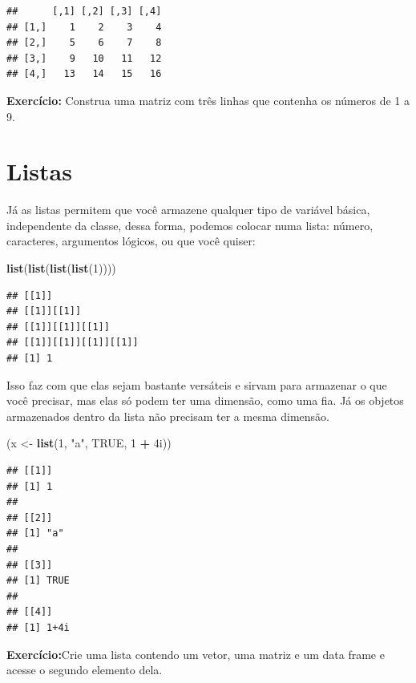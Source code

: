 \documentclass[]{book}
\newenvironment{Shaded}{\begin{snugshade}}{\end{snugshade}}
\newcommand{\KeywordTok}[1]{\textcolor[rgb]{0.13,0.29,0.53}{\textbf{#1}}}
\newcommand{\DecValTok}[1]{\textcolor[rgb]{0.00,0.00,0.81}{#1}}
\newcommand{\StringTok}[1]{\textcolor[rgb]{0.31,0.60,0.02}{#1}}
\newcommand{\OtherTok}[1]{\textcolor[rgb]{0.56,0.35,0.01}{#1}}
\newcommand{\OperatorTok}[1]{\textcolor[rgb]{0.81,0.36,0.00}{\textbf{#1}}}
\newcommand{\NormalTok}[1]{#1}
\theoremstyle{definition}
\theoremstyle{definition}
\theoremstyle{definition}
\theoremstyle{remark}
\begin{document}
\begin{verbatim}
##      [,1] [,2] [,3] [,4]
## [1,]    1    2    3    4
## [2,]    5    6    7    8
## [3,]    9   10   11   12
## [4,]   13   14   15   16
\end{verbatim}

\textbf{Exercício:} Construa uma matriz com três linhas que contenha os
números de 1 a 9.

\section{Listas}\label{listas}

Já as listas permitem que você armazene qualquer tipo de variável
básica, independente da classe, dessa forma, podemos colocar numa lista:
número, caracteres, argumentos lógicos, ou que você quiser:

\begin{Shaded}
\begin{Highlighting}[]
\KeywordTok{list}\NormalTok{(}\KeywordTok{list}\NormalTok{(}\KeywordTok{list}\NormalTok{(}\KeywordTok{list}\NormalTok{(}\DecValTok{1}\NormalTok{))))}
\end{Highlighting}
\end{Shaded}

\begin{verbatim}
## [[1]]
## [[1]][[1]]
## [[1]][[1]][[1]]
## [[1]][[1]][[1]][[1]]
## [1] 1
\end{verbatim}

Isso faz com que elas sejam bastante versáteis e sirvam para armazenar o
que você precisar, mas elas só podem ter uma dimensão, como uma fia. Já
os objetos armazenados dentro da lista não precisam ter a mesma
dimensão.

\begin{Shaded}
\begin{Highlighting}[]
\NormalTok{(x <-}\StringTok{ }\KeywordTok{list}\NormalTok{(}\DecValTok{1}\NormalTok{, }\StringTok{"a"}\NormalTok{, }\OtherTok{TRUE}\NormalTok{, }\DecValTok{1} \OperatorTok{+}\StringTok{ }\NormalTok{4i))}
\end{Highlighting}
\end{Shaded}

\begin{verbatim}
## [[1]]
## [1] 1
## 
## [[2]]
## [1] "a"
## 
## [[3]]
## [1] TRUE
## 
## [[4]]
## [1] 1+4i
\end{verbatim}

\textbf{Exercício:}Crie uma lista contendo um vetor, uma matriz e um
data frame e acesse o segundo elemento dela.
\end{document}
